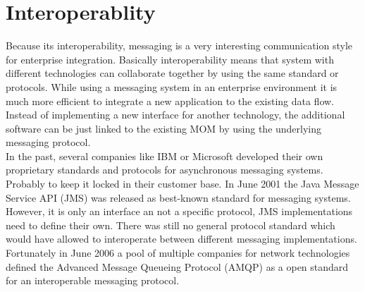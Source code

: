 \section{Interoperablity}
Because its interoperability, messaging is a very interesting communication
style for enterprise integration. Basically interoperability means that system with
different technologies can collaborate together by using the same standard or
protocols. While using a messaging system in an enterprise environment it is
much more efficient to integrate a new application to the existing data flow.
Instead of implementing a new interface for another technology, the additional
software can be just linked to the existing MOM by using the underlying
messaging protocol.\\

In the past, several companies like IBM or Microsoft developed their own
proprietary standards and protocols for asynchronous messaging systems.
Probably to keep it locked in their customer base. In June 2001 the Java Message
Service API (JMS) was released as best-known standard for messaging systems.
However, it is only an interface an not a specific protocol, JMS implementations
need to define their own. There was still no general protocol standard which
would have allowed to interoperate between different messaging implementations.
Fortunately in June 2006 a pool of multiple companies for network technologies
defined the Advanced Message Queueing Protocol (AMQP) as a open standard for an
interoperable messaging protocol. \cite{PrpAMQP}
 

